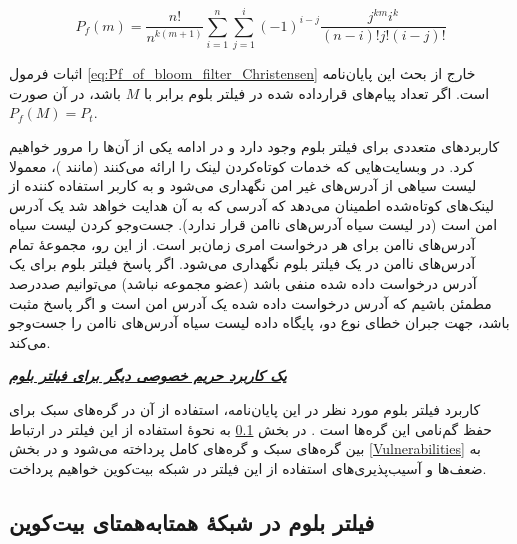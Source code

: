 \begin{equation}
P_f(m) = \frac{n!}{n^{k(m+1)}} \sum_{i=1}^{n} \sum_{j=1}^{i} (-1)^{i-j} \frac{j^{km}i^k}{(n-i)!j!(i-j)!}
\label{eq:Pf_of_bloom_filter_Christensen}
\end{equation}


اثبات فرمول \eqref{eq:Pf_of_bloom_filter_Christensen} خارج از بحث این پایان‌نامه است. اگر تعداد پیام‌های قرارداده شده در فیلتر بلوم برابر با $M$ باشد، در آن صورت 
$P_f(M)=P_t$.


کاربرد‌های متعددی برای فیلتر بلوم وجود دارد و در ادامه یکی از آن‌ها را مرور خواهیم کرد. در وبسایت‌هایی که خدمات کوتاه‌کردن لینک را ارائه می‌کنند (مانند \cite{Bitly.comTeam2020})، معمولا لیست سیاهی از آدرس‌های غیر امن نگهداری می‌شود و به کاربر استفاده کننده از لینک‌های کوتاه‌شده اطمینان می‌دهد که آدرسی که به آن هدایت خواهد شد یک آدرس امن است (در لیست سیاه آدرس‌های ناامن قرار ندارد). جست‌وجو کردن لیست سیاه آدرس‌های ناامن برای هر درخواست امری زمان‌بر است. از این رو، مجموعهٔ تمام آدرس‌های ناامن در یک فیلتر بلوم نگهداری می‌شود. اگر پاسخ فیلتر بلوم برای یک آدرس درخواست داده شده منفی باشد (عضو مجموعه نباشد) می‌توانیم صددرصد مطمئن باشیم که آدرس در‌خواست داده شده یک آدرس امن است و اگر پاسخ مثبت باشد،‌ جهت جبران خطای نوع دو، پایگاه‌ داده لیست سیاه آدرس‌های ناامن را جست‌وجو می‌کند\cite{Azar2016}.

\textbf{\textit{\underline{یک کاربرد حریم خصوصی دیگر برای فیلتر بلوم}}}

کاربرد فیلتر بلوم مورد نظر در این پایان‌نامه، استفاده از آن در گره‌های سبک برای حفظ گم‌نامی این گره‌ها است \cite{Hearn2013}. در بخش‌  \ref{BloomFilterInP2P} به نحوهٔ استفاده از این فیلتر در ارتباط بین گره‌های سبک و گره‌های کامل پرداخته می‌شود و در بخش \ref{Vulnerabilities} به ضعف‌ها و آسیب‌پذیری‌های استفاده از این فیلتر در شبکه بیت‌کوین خواهیم پرداخت. 


\subsection{فیلتر بلوم در شبکهٔ همتا‌به‌همتای بیت‌کوین}
\label{BloomFilterInP2P}

